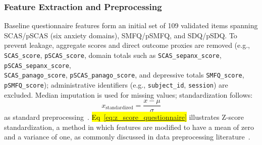 \documentclass[10pt,letterpaper]{article}
\begin{document}
                                                                        \subsubsection*{\textbf{Feature Extraction and Preprocessing}}
                                                                        Baseline questionnaire features form an initial set of 109 validated items spanning SCAS/pSCAS (six anxiety domains), SMFQ/pSMFQ, and SDQ/pSDQ. To prevent leakage, aggregate scores and direct outcome proxies are removed (e.g., \texttt{SCAS\_score}, \texttt{pSCAS\_score}, domain totals such as \texttt{SCAS\_sepanx\_score}, \texttt{pSCAS\_sepanx\_score}, \\
                                                                        \texttt{SCAS\_panago\_score}, \texttt{pSCAS\_panago\_score}, and depressive totals \texttt{SMFQ\_score},\\
                                                                         \texttt{pSMFQ\_score}); administrative identifiers (e.g., \texttt{subject\_id}, \texttt{session}) are excluded. Median imputation is used for missing values; standardization follows:
                                                                         \begin{equation}
                                                                         \label{eq:z_score_questionnaire}
                                                                         x_{\text{standardized}} = \frac{x - \mu}{\sigma}
                                                                         \end{equation}
                                                                         as standard preprocessing~\cite{ref48}. \hl{Eq~\ref{eq:z_score_questionnaire}} illustrates Z-score standardization, a method in which features are modified to have a mean of zero and a variance of one, as commonly discussed in data preprocessing literature~\cite{ref48}.
\end{document}
